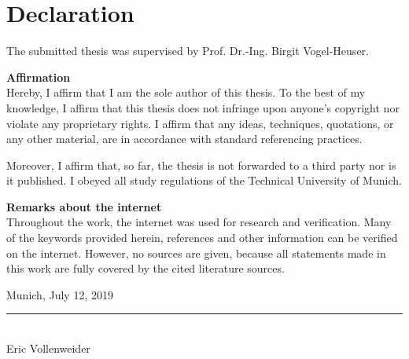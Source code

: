 \chapter*{Declaration}
\thispagestyle{plain}
%
The submitted thesis was supervised by Prof. Dr.-Ing. Birgit Vogel-Heuser.
\vspace{1cm}

\textbf{Affirmation}\\
Hereby, I affirm that I am the sole author of this thesis. To the best of my knowledge, I affirm that this thesis does not infringe upon anyone's copyright nor violate any proprietary rights. I affirm that any ideas, techniques, quotations, or any other material, are in accordance with standard referencing practices.

Moreover, I affirm that, so far, the thesis is not forwarded to a third party nor is it published. I obeyed all study regulations of the Technical University of Munich.

\vspace{1cm}

\textbf{Remarks about the internet}\\
Throughout the work, the internet was used for research and verification. Many of the keywords provided herein, references and other information can be verified on the internet. However, no sources are given, because all statements made in this work are fully covered by the cited literature sources.

\vspace*{2.5cm}
\hspace*{1cm} Munich, July 12, 2019
\hspace*{3cm}\rule[-3pt]{5cm}{1pt} \hspace*{2cm}\\
\hspace*{9.3cm} Eric Vollenweider
